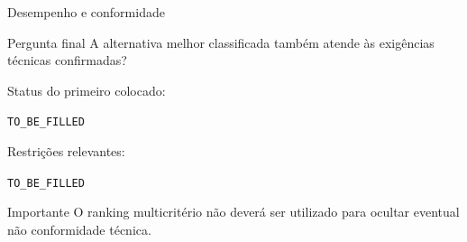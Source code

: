 
\begin{frame}{Desempenho e conformidade}

    \begin{block}{Pergunta final}
        A alternativa melhor classificada também atende às exigências
        técnicas confirmadas?
    \end{block}

    \vspace{0.4cm}

    Status do primeiro colocado:

    \begin{center}
        \texttt{TO\_BE\_FILLED}
    \end{center}

    \vspace{0.3cm}

    Restrições relevantes:

    \begin{center}
        \texttt{TO\_BE\_FILLED}
    \end{center}

    \vspace{0.3cm}

    \begin{alertblock}{Importante}
        O ranking multicritério não deverá ser utilizado para ocultar
        eventual não conformidade técnica.
    \end{alertblock}

\end{frame}



